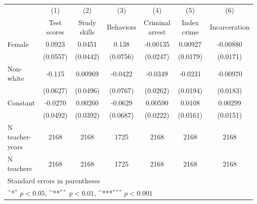{
\def\sym#1{\ifmmode^{#1}\else\(^{#1}\)\fi}
\begin{tabular}{l*{6}{c}}
\hline\hline
            &\multicolumn{1}{c}{(1)}&\multicolumn{1}{c}{(2)}&\multicolumn{1}{c}{(3)}&\multicolumn{1}{c}{(4)}&\multicolumn{1}{c}{(5)}&\multicolumn{1}{c}{(6)}\\
            &\multicolumn{1}{c}{Test scores}&\multicolumn{1}{c}{Study skills}&\multicolumn{1}{c}{Behaviors}&\multicolumn{1}{c}{Criminal arrest}&\multicolumn{1}{c}{Index crime}&\multicolumn{1}{c}{Incarceration}\\
\hline
Female      &      0.0923         &      0.0451         &       0.138         &    -0.00135         &     0.00927         &    -0.00880         \\
            &    (0.0557)         &    (0.0442)         &    (0.0756)         &    (0.0247)         &    (0.0179)         &    (0.0171)         \\
[1em]
Non-white   &      -0.115         &     0.00969         &     -0.0422         &     -0.0349         &     -0.0231         &    -0.00970         \\
            &    (0.0627)         &    (0.0496)         &    (0.0767)         &    (0.0262)         &    (0.0194)         &    (0.0183)         \\
[1em]
Constant    &     -0.0270         &     0.00260         &     -0.0629         &     0.00590         &      0.0108         &     0.00299         \\
            &    (0.0492)         &    (0.0392)         &    (0.0687)         &    (0.0222)         &    (0.0161)         &    (0.0151)         \\
\hline
N teacher-years&        2168         &        2168         &        1725         &        2168         &        2168         &        2168         \\
N teachers  &        2168         &        2168         &        1725         &        2168         &        2168         &        2168         \\
\hline\hline
\multicolumn{7}{l}{\footnotesize Standard errors in parentheses}\\
\multicolumn{7}{l}{\footnotesize \sym{*} \(p<0.05\), \sym{**} \(p<0.01\), \sym{***} \(p<0.001\)}\\
\end{tabular}
}

